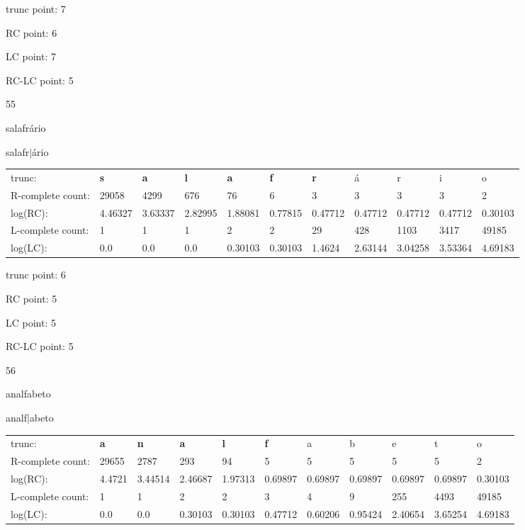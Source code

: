 \documentclass{article}
\begin{document}
trunc point: 7

RC point: 6

LC point: 7

RC-LC point: 5

\vspace{3em}



55

salafrário

salafr$|$ário

\vspace{1em}

\begin{tabular}{l|llllllllll}

trunc: & {\color{red}\bf s} & {\color{red}\bf a} & {\color{red}\bf l} & {\color{red}\bf a} & {\color{red}\bf f} & {\color{red}\bf r} & á & r & i & o \\ 
R-complete count: & 29058 & 4299 & 676 & 76 & 6 & 3 & 3 & 3 & 3 & 2 \\ 
log(RC): & 4.46327 & 3.63337 & 2.82995 & 1.88081 & 0.77815 & 0.47712 & 0.47712 & 0.47712 & 0.47712 & 0.30103 \\ 
L-complete count: & 1 & 1 & 1 & 2 & 2 & 29 & 428 & 1103 & 3417 & 49185 \\ 
log(LC): & 0.0 & 0.0 & 0.0 & 0.30103 & 0.30103 & 1.4624 & 2.63144 & 3.04258 & 3.53364 & 4.69183 \\ 
\end{tabular}

trunc point: 6

RC point: 5

LC point: 5

RC-LC point: 5

\vspace{3em}



56

analfabeto

analf$|$abeto

\vspace{1em}

\begin{tabular}{l|llllllllll}

trunc: & {\color{red}\bf a} & {\color{red}\bf n} & {\color{red}\bf a} & {\color{red}\bf l} & {\color{red}\bf f} & a & b & e & t & o \\ 
R-complete count: & 29655 & 2787 & 293 & 94 & 5 & 5 & 5 & 5 & 5 & 2 \\ 
log(RC): & 4.4721 & 3.44514 & 2.46687 & 1.97313 & 0.69897 & 0.69897 & 0.69897 & 0.69897 & 0.69897 & 0.30103 \\ 
L-complete count: & 1 & 1 & 2 & 2 & 3 & 4 & 9 & 255 & 4493 & 49185 \\ 
log(LC): & 0.0 & 0.0 & 0.30103 & 0.30103 & 0.47712 & 0.60206 & 0.95424 & 2.40654 & 3.65254 & 4.69183 \\ 
\end{tabular}
\end{document}
